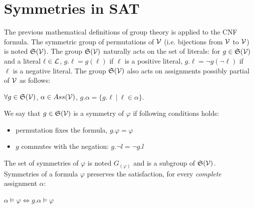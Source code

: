 \section{Symmetries in SAT}

The previous mathematical definitions of group theory is applied to the CNF formula.
The symmetric group of permutations of $\mathcal{V}$ (i.e. bijections from $\mathcal{V}$ to $\mathcal{V}$) is noted
$\mathfrak{S}(\mathcal{V})$. The group $\mathfrak{S}(\mathcal{V})$ naturally acts on the set of literals: for $g
\in \mathfrak{S}(\mathcal{V})$ and a literal $\ell \in \mathcal{L} $, $g.\ell = g(\ell)$ if $\ell$ is a
positive literal, $g.\ell = \neg g(\neg \ell)$ if $\ell$ is a negative literal.
The group $\mathfrak{S}(\mathcal{V})$ also acts on  assignments possibly partial of $\mathcal{V}$ as follows: 
\begin{center}
	$\forall g \in \mathfrak{S}(\mathcal{V})$, $\alpha \in Ass(\mathcal{V})$, $g.\alpha = \{ g.\ell ~|~ \ell \in \alpha \}$.
\end{center}

 We say that $g\in \mathfrak{S}(\mathcal{V})$ is a symmetry of $ \varphi$ if following conditions holds:
\begin{itemize}[topsep=0em]
	\item permutation fixes the formula, $g.\varphi =  \varphi$ 
	\item $g$  commutes with the negation: $g.\neg l  = \neg g.l$
\end{itemize}

The set of symmetries of $\varphi$ is noted $G_(\varphi)$ and is a subgroup of $\mathfrak{S}(\mathcal{V})$.
Symmetries of a formula $\varphi$ preserves the satisfaction, for every \emph{complete} assignment $\alpha$:

\begin{center}
	$\alpha \models \varphi\Leftrightarrow g.\alpha \models \varphi$
\end{center}

